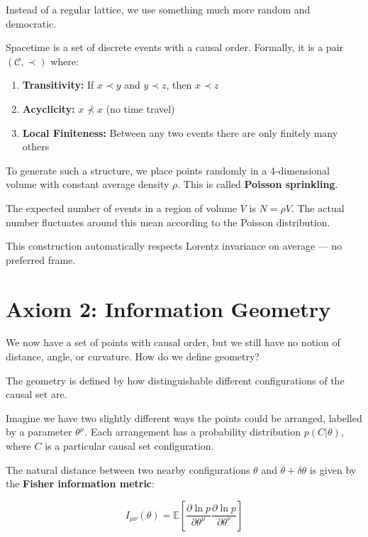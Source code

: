 \documentclass[11pt, a4paper, openany]{book}
\begin{document}
Instead of a regular lattice, we use something much more random and democratic.

\begin{axiom}
Spacetime is a set of discrete events with a causal order. Formally, it is a pair $(\mathcal{C}, \prec)$ where:
\begin{enumerate}
  \item \textbf{Transitivity:} If $x \prec y$ and $y \prec z$, then $x \prec z$
  \item \textbf{Acyclicity:} $x \nprec x$ (no time travel)
  \item \textbf{Local Finiteness:} Between any two events there are only finitely many others
\end{enumerate}
\end{axiom}

To generate such a structure, we place points randomly in a 4-dimensional volume with constant average density $\rho$. This is called \textbf{Poisson sprinkling}.

The expected number of events in a region of volume $V$ is $N = \rho V$.
The actual number fluctuates around this mean according to the Poisson distribution.

This construction automatically respects Lorentz invariance on average --- no preferred frame.

\section{Axiom 2: Information Geometry}

We now have a set of points with causal order, but we still have no notion of distance, angle, or curvature. How do we define geometry?

\begin{axiom}
The geometry is defined by how distinguishable different configurations of the causal set are.
\end{axiom}

Imagine we have two slightly different ways the points could be arranged, labelled by a parameter $\theta^\mu$.
Each arrangement has a probability distribution $p(C|\theta)$, where $C$ is a particular causal set configuration.

The natural distance between two nearby configurations $\theta$ and $\theta + \delta\theta$ is given by the \textbf{Fisher information metric}:

\begin{equation}
I_{\mu\nu}(\theta) = \mathbb{E}\left[ \frac{\partial \ln p}{\partial \theta^\mu} \frac{\partial \ln p}{\partial \theta^\nu} \right]
\end{equation}
\end{document}
